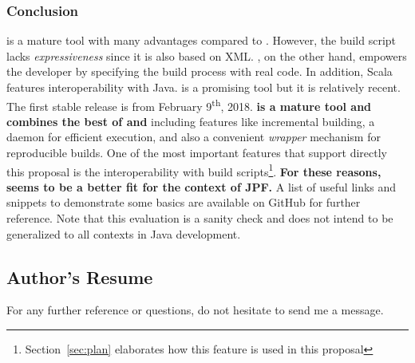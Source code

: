 \documentclass{article}
\begin{document}
\subsubsection*{Conclusion}
\maven{} is a mature tool with many advantages compared to \ant{}.
However, the build script lacks \emph{expressiveness} since it is also based on
XML.
\sbt{}, on the other hand, empowers the developer by specifying the build
process with real code.
In addition, Scala features interoperability with Java.
\sbt{} is a promising tool but it is relatively recent.
The first stable release is from February 9\textsuperscript{th},
2018\cite{page:sbt-release}.
\textbf{\gradle{} is a mature tool and combines the best of \maven{} and \sbt{}}
including features like incremental building, a daemon for efficient
execution\cite{page:gradle-daemon}, and also a convenient \emph{wrapper}
mechanism\cite{page:gradle-wrapper} for reproducible builds.
One of the most important \gradle{} features that support directly this
proposal is the interoperability with \ant{} build
scripts\cite{page:gradle-ant-support}\footnote{Section~\ref{sec:plan}
elaborates how this feature is used in this proposal}.
\textbf{For these reasons, \gradle{} seems to be a better fit for the context
of JPF.}
A list of useful links and snippets to demonstrate some \gradle{} basics are
available on GitHub\cite{page:gradle-labs} for further reference. 
Note that this evaluation is a sanity check and does not intend to be
generalized to all contexts in Java development.

\subsection{Author's Resume}
\label{sec:cv}

\centering
{}
\vfill
For any further reference or questions, do not hesitate to send me a message.

\clearpage


\end{document}

